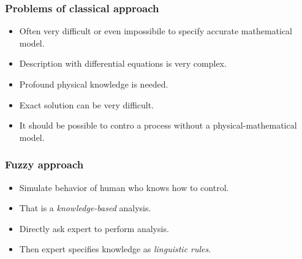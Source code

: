\documentclass{article}
\begin{document}
\subsubsection{Problems of classical approach}
\begin{itemize}
    \item Often very difficult or even impossibile to specify accurate mathematical model.
    \item Description with differential equations is very complex.
    \item Profound physical knowledge is needed.
    \item Exact solution can be very difficult.
    \item It should be possible to contro a process without a physical-mathematical model.
\end{itemize}

\subsubsection{Fuzzy approach}
\begin{itemize}
    \item Simulate behavior of human who knows how to control.
    \item That is a \textit{knowledge-based} analysis.
    \item Directly ask expert to perform analysis.
    \item Then expert specifies knowledge as \textit{linguistic rules}.
\end{itemize}
\end{document}
